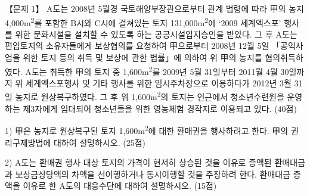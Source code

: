 \begin{longquestion}{【문제 1】}
A도는 2008년 5월경 국토해양부장관으로부터 관계 법령에 따라 甲의 농지 4,000m\textsuperscript{2}를 포함한 B시와 C시에 걸쳐있는 토지 131,000m\textsuperscript{2}에 ‘2009 세계엑스포’ 행사를 위한 문화시설을 설치할 수 있도록 하는 공공시설입지승인을 받았다. 그 후 A도는 편입토지의 소유자들에게 보상협의를 요청하여 甲으로부터 2008년 12월 5일 「공익사업을 위한 토지 등의 취득 및 보상에 관한 법률」에 의하여 위 甲의 농지를 협의취득하였다. A도는 취득한 甲의 토지 중 1,600m\textsuperscript{2}를 2009년 5월 31일부터 2011월 4월 30일까지 위 세계엑스포행사 및 기타 행사를 위한 임시주차장으로 이용하다가 2012년 3월 31일 농지로 원상복구하였다. 그 후 위 1,600m\textsuperscript{2}의 토지는 인근에서 청소년수련원을 운영하는 제3자에게 임대되어 청소년들을 위한 영농체험 경작지로 이용되고 있다. (40점) \par
1) 甲은 농지로 원상복구된 토지 1,600m\textsuperscript{2}에 대한 환매권을 행사하려고 한다. 甲의 권리구제방법에 대하여 설명하시오. (25점) \par
2) A도는 환매권 행사 대상 토지의 가격이 현저히 상승된 것을 이유로 증액된 환매대금과 보상금상당액의 차액을 선이행하거나 동시이행할 것을 주장하려 한다. 환매대금 증액을 이유로 한 A도의 대응수단에 대하여 설명하시오. (15점) \par
\end{longquestion}
